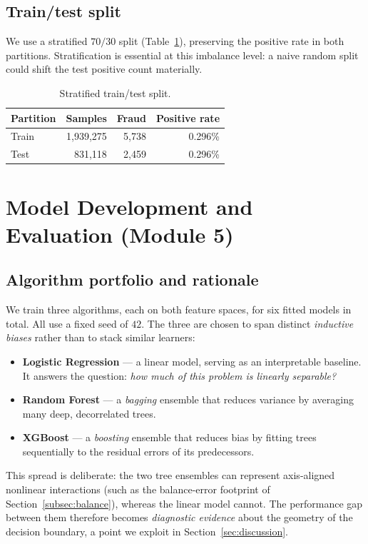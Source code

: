 \documentclass{article}
\begin{document}
\subsection{Train/test split}
We use a stratified $70/30$ split (Table~\ref{tab:split}), preserving
the positive rate in both partitions. Stratification is essential at
this imbalance level: a naive random split could shift the test
positive count materially.

\begin{table}[H]
\centering
\caption{Stratified train/test split.}
\label{tab:split}
\begin{tabular}{lrrr}
\toprule
Partition & Samples & Fraud & Positive rate \\
\midrule
Train & 1{,}939{,}275 & 5{,}738 & 0.296\% \\
Test  & 831{,}118     & 2{,}459 & 0.296\% \\
\bottomrule
\end{tabular}
\end{table}

\section{Model Development and Evaluation (Module 5)}
\label{sec:model}

\subsection{Algorithm portfolio and rationale}
We train three algorithms, each on both feature spaces, for six fitted
models in total. All use a fixed seed of $42$. The three are chosen to
span distinct \emph{inductive biases} rather than to stack similar
learners:

\begin{itemize}
    \item \textbf{Logistic Regression} --- a linear model, serving as
    an interpretable baseline. It answers the question: \emph{how much
    of this problem is linearly separable?}
    \item \textbf{Random Forest} --- a \emph{bagging} ensemble that
    reduces variance by averaging many deep, decorrelated trees.
    \item \textbf{XGBoost} --- a \emph{boosting} ensemble that reduces
    bias by fitting trees sequentially to the residual errors of its
    predecessors.
\end{itemize}

This spread is deliberate: the two tree ensembles can represent
axis-aligned nonlinear interactions (such as the balance-error
footprint of Section~\ref{subsec:balance}), whereas the linear model
cannot. The performance gap between them therefore becomes
\emph{diagnostic evidence} about the geometry of the decision boundary,
a point we exploit in Section~\ref{sec:discussion}.
\end{document}
